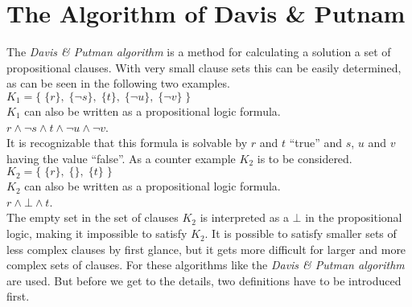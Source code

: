 \section{The Algorithm of Davis \& Putnam}
\label{sec:sciDavisPutnam}
The \textit{Davis \& Putman algorithm} is a method for calculating a solution a set of propositional clauses. With very small clause sets this can be easily determined, as can be seen in the following two examples.
\\[0.2cm]
\hspace*{1.3cm} $K_1 = \bigl\{\; \{r\},\; \{\neg s\},\; \{t\},\; \{\neg u\}, \; \{\neg v\} \;\bigr\}$ 
\\[0.2cm]
$K_1$ can also be written as a propositional logic formula.
\\[0.2cm]
\hspace*{1.3cm} $r \land \neg s \land t \land \neg u \land \neg v$.
\\[0.2cm]
It is recognizable that this formula is solvable by $r$ and $t$ \enquote{true} and $s$, $u$ and $v$ having the value \enquote{false}.
As a counter example $K_2$ is to be considered.
\\[0.2cm]
\hspace*{1.3cm} $K_2 = \bigl\{\; \{r\},\; \{\},\; \{t\} \;\bigr\}$
\\[0.2cm]
$K_2$ can also be written as a propositional logic formula.
\\[0.2cm]
\hspace*{1.3cm}
$r \land \bot \land t$.
\\[0.2cm]
The empty set in the set of clauses $K_2$ is interpreted as a $\bot$ in the propositional logic, making it impossible to satisfy $K_2$. It is possible to satisfy smaller sets of less complex clauses by first glance, but it gets more difficult for larger and more complex sets of clauses. For these algorithms like the \textit{Davis \& Putman algorithm} are used. But before we get to the details, two definitions have to be introduced first. \cite{Zhang2000}

